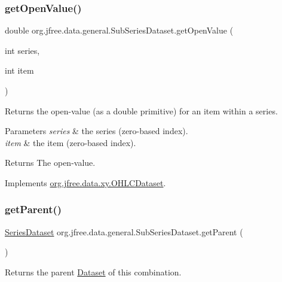 \subsubsection{\texorpdfstring{get\+Open\+Value()}{getOpenValue()}}
{\footnotesize\ttfamily double org.\+jfree.\+data.\+general.\+Sub\+Series\+Dataset.\+get\+Open\+Value (\begin{DoxyParamCaption}\item[{int}]{series,  }\item[{int}]{item }\end{DoxyParamCaption})}

Returns the open-\/value (as a double primitive) for an item within a series.


\begin{DoxyParams}{Parameters}
{\em series} & the series (zero-\/based index). \\
\hline
{\em item} & the item (zero-\/based index).\\
\hline
\end{DoxyParams}
\begin{DoxyReturn}{Returns}
The open-\/value. 
\end{DoxyReturn}


Implements \mbox{\hyperlink{interfaceorg_1_1jfree_1_1data_1_1xy_1_1_o_h_l_c_dataset_a20654fd4801bc8871dfe51bf65d62af6}{org.\+jfree.\+data.\+xy.\+O\+H\+L\+C\+Dataset}}.

\mbox{\label{classorg_1_1jfree_1_1data_1_1general_1_1_sub_series_dataset_a0817fc414a8e775feff83818ce9a6740}} 
\subsubsection{\texorpdfstring{get\+Parent()}{getParent()}}
{\footnotesize\ttfamily \mbox{\hyperlink{interfaceorg_1_1jfree_1_1data_1_1general_1_1_series_dataset}{Series\+Dataset}} org.\+jfree.\+data.\+general.\+Sub\+Series\+Dataset.\+get\+Parent (\begin{DoxyParamCaption}{ }\end{DoxyParamCaption})}

Returns the parent \mbox{\hyperlink{interfaceorg_1_1jfree_1_1data_1_1general_1_1_dataset}{Dataset}} of this combination.

